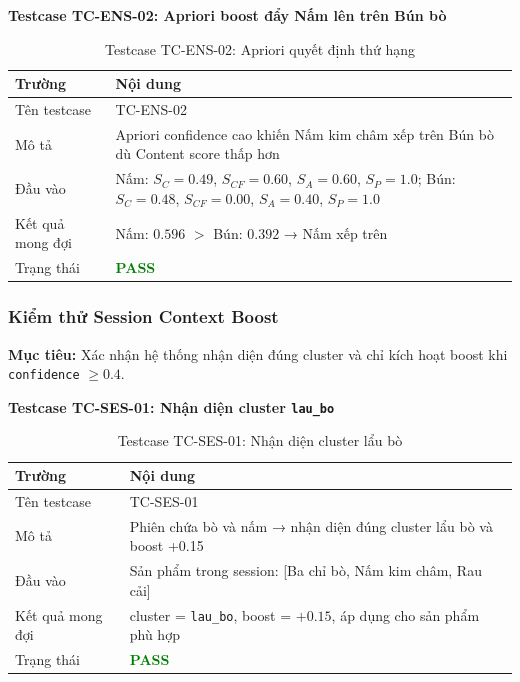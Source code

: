 \documentclass[12pt,a4paper]{report}
\begin{document}
\textbf{Testcase TC-ENS-02: Apriori boost đẩy Nấm lên trên Bún bò}

\begin{table}[htbp]
\centering
\renewcommand{\arraystretch}{1.3}
\begin{tabular}{|l|p{8cm}|}
\hline
\rowcolor[HTML]{EFEFEF}
\textbf{Trường} & \textbf{Nội dung} \\ \hline
Tên testcase & TC-ENS-02 \\ \hline
Mô tả & Apriori confidence cao khiến Nấm kim châm xếp trên Bún bò dù Content score thấp hơn \\ \hline
Đầu vào & Nấm: $S_C=0.49$, $S_{CF}=0.60$, $S_A=0.60$, $S_P=1.0$; Bún: $S_C=0.48$, $S_{CF}=0.00$, $S_A=0.40$, $S_P=1.0$ \\ \hline
Kết quả mong đợi & Nấm: $0.596$ $>$ Bún: $0.392$ → Nấm xếp trên \\ \hline
Trạng thái & \textcolor{green}{\textbf{PASS}} \\ \hline
\end{tabular}
\caption{Testcase TC-ENS-02: Apriori quyết định thứ hạng}
\end{table}

\subsubsection{Kiểm thử Session Context Boost}

\textbf{Mục tiêu:} Xác nhận hệ thống nhận diện đúng cluster và chỉ kích hoạt boost khi \texttt{confidence} $\geq 0.4$.

\textbf{Testcase TC-SES-01: Nhận diện cluster \texttt{lau\_bo}}

\begin{table}[htbp]
\centering
\renewcommand{\arraystretch}{1.3}
\begin{tabular}{|l|p{8cm}|}
\hline
\rowcolor[HTML]{EFEFEF}
\textbf{Trường} & \textbf{Nội dung} \\ \hline
Tên testcase & TC-SES-01 \\ \hline
Mô tả & Phiên chứa bò và nấm → nhận diện đúng cluster lẩu bò và boost +0.15 \\ \hline
Đầu vào & Sản phẩm trong session: [Ba chỉ bò, Nấm kim châm, Rau cải] \\ \hline
Kết quả mong đợi & cluster = \texttt{lau\_bo}, boost = $+0.15$, áp dụng cho sản phẩm phù hợp \\ \hline
Trạng thái & \textcolor{green}{\textbf{PASS}} \\ \hline
\end{tabular}
\caption{Testcase TC-SES-01: Nhận diện cluster lẩu bò}
\end{table}
\end{document}
